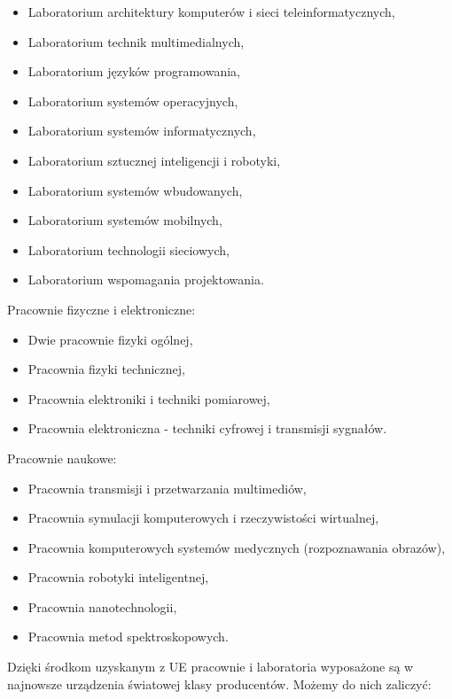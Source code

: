 \documentclass[a4paper,12pt]{article}
\begin{document}
\begin{itemize}
\item Laboratorium architektury komputerów i sieci teleinformatycznych,
\item Laboratorium technik multimedialnych,
\item Laboratorium języków programowania,
\item Laboratorium systemów operacyjnych,
\item Laboratorium systemów informatycznych,
\item Laboratorium sztucznej inteligencji i robotyki,
\item Laboratorium systemów wbudowanych,
\item Laboratorium systemów mobilnych,
\item Laboratorium technologii sieciowych,
\item Laboratorium wspomagania projektowania.
\end{itemize}
{}Pracownie fizyczne i elektroniczne:

\begin{itemize}
\item Dwie pracownie fizyki ogólnej,
\item Pracownia fizyki technicznej,
\item Pracownia elektroniki i techniki pomiarowej,
\item Pracownia elektroniczna - techniki cyfrowej i transmisji sygnałów.
\end{itemize}
{} Pracownie naukowe:

\begin{itemize}
\item Pracownia transmisji i przetwarzania multimediów,
\item Pracownia symulacji komputerowych i rzeczywistości wirtualnej,
\item Pracownia komputerowych systemów medycznych (rozpoznawania obrazów),
\item Pracownia robotyki inteligentnej,
\item Pracownia nanotechnologii,
\item Pracownia metod spektroskopowych.
\end{itemize}
{}Dzięki środkom uzyskanym z UE pracownie i laboratoria wyposażone są w najnowsze urządzenia światowej
klasy producentów. Możemy do nich zaliczyć:
\end{document}
